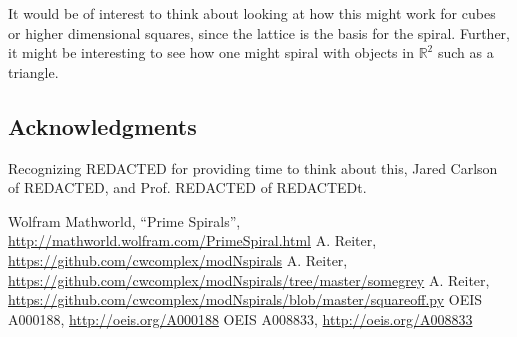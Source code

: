 \documentclass[11pt]{amsart}
\theoremstyle{mydef}
\begin{document}
It would be of interest to think about looking at how this might work for cubes or higher dimensional squares, since the lattice is the basis for the spiral. Further, it might be interesting to see how one might spiral with objects in $\mathbb{R}^2$ such as a triangle.
\subsection{Acknowledgments}
Recognizing REDACTED for providing time to think about this, Jared Carlson of REDACTED, and Prof. REDACTED  of REDACTEDt.

\begin{thebibliography}{1}
 Wolfram Mathworld, ``Prime Spirals'', \url{http://mathworld.wolfram.com/PrimeSpiral.html}
 A. Reiter, \url{https://github.com/cwcomplex/modNspirals}
 A. Reiter, \url{https://github.com/cwcomplex/modNspirals/tree/master/somegrey}
 A. Reiter, \url{https://github.com/cwcomplex/modNspirals/blob/master/squareoff.py}
 OEIS A000188, \url{http://oeis.org/A000188}
 OEIS A008833, \url{http://oeis.org/A008833}

\end{thebibliography}
\end{document}
